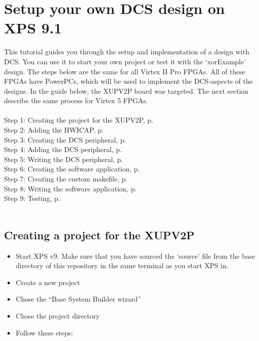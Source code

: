 \documentclass[a4paper,oneside]{memoir}
\begin{document}
\section{Setup your own DCS design on XPS 9.1}\label{sec:XPS9}
This tutorial guides you through the setup and implementation of a design with DCS. You can use it to start your own project or test it with the `xorExample' design. The steps below are the same for all Virtex II Pro FPGAs. All of these FPGAs have PowerPCs, which will be used to implement the DCS-aspects of the designs. In the guide below, the XUPV2P board was targeted. The next section describe the same process for Virtex 5 FPGAs.\\
\\
Step 1: Creating the project for the XUPV2P, p.\ \pageref{sec:creating_proj}\\
Step 2: Adding the HWICAP, p.\ \pageref{sec:adding_hwicap}\\
Step 3: Creating the DCS peripheral, p.\ \pageref{sec:creating_peripheral}\\
Step 4: Adding the DCS peripheral, p.\ \pageref{sec:adding_peripheral}\\
Step 5: Writing the DCS peripheral, p.\ \pageref{sec:writing_peripheral}\\
Step 6: Creating the software application, p.\ \pageref{sec:creating_software}\\
Step 7: Creating the custom makefile, p.\ \pageref{sec:creating_makefile}\\
Step 8: Writing the software application, p.\ \pageref{sec:writing_software}\\
Step 9: Testing, p.\ \pageref{sec:testing}\\
\\



\subsection{Creating a project for the XUPV2P}\label{sec:creating_proj}

\begin{itemize}
\item Start XPS v9. Make sure that you have sourced the `source' file from the base directory of this repository in the same terminal as you start XPS in.
\item    Create a new project
\item    Chose the ``Base System Builder wizard''
\item    Chose the project directory
\item    Follow these steps:
\end{itemize}
\end{document}
